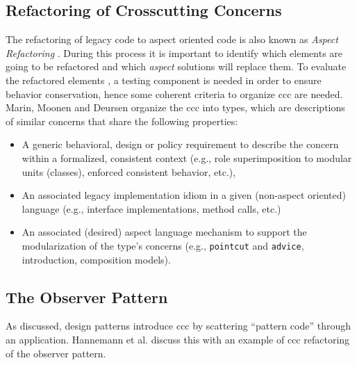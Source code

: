 \subsection{Refactoring of Crosscutting Concerns}\label{Refactoring of ccc}
The refactoring of legacy code to aspect oriented code is also known as \textit{Aspect Refactoring} \cite{marin2005approach}. 
During this process it is important to identify which elements are going to be refactored and which \textit{aspect} solutions will replace them. 
To evaluate the refactored elements \cite{fowler2009refactoring}, a testing component is needed in order to ensure behavior conservation, hence some coherent criteria to organize \ac{ccc} are needed. 
Marin, Moonen and Deursen \cite{marin2005approach} organize the \ac{ccc} into types, which are descriptions of similar concerns that share the following properties: 

\begin{itemize}
	\item A generic behavioral, design or policy requirement to describe the concern within a formalized, consistent context (e.g., role superimposition to modular units (classes), enforced consistent behavior, etc.),

	\item An associated legacy implementation idiom in a given (non-aspect oriented) language (e.g., interface implementations, method calls, etc.)

	\item An associated (desired) aspect language mechanism to support the modularization of the type's concerns (e.g., \texttt{pointcut} and \texttt{advice}, introduction, composition models).
\end{itemize}

\subsection{The Observer Pattern}\label{The Observer Pattern}
As discussed, design patterns introduce \ac{ccc} by scattering ``pattern code'' through an application.
Hannemann et al. \cite{hannemann2005role} discuss this with an example of \ac{ccc} refactoring of the observer pattern.

